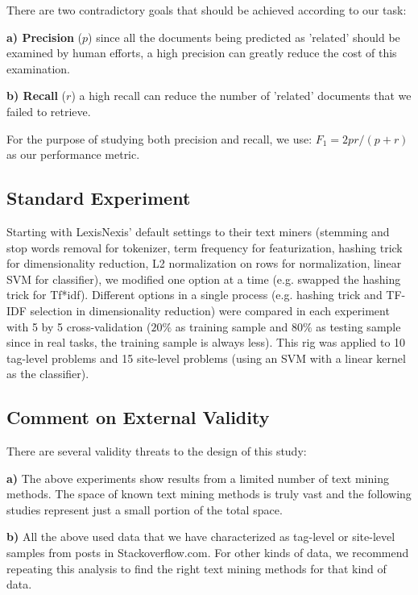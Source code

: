 \documentclass{sig-alternate-05-2015}
\theoremstyle{break}
\begin{document}

There are two contradictory goals that should be achieved according to our task: 

\textbf{a) Precision} ($p$) since all the documents being predicted as 'related' should be examined by human efforts, a high precision can greatly reduce the cost of this examination.

\textbf{b) Recall} ($r$) a high recall can reduce the number of 'related' documents that we failed to retrieve.

For the purpose of studying both precision and recall, we use:
 \mbox{$F_{1}=  2pr/(p+r)$}
as  our  performance metric.

\subsection{Standard Experiment}
%
Starting with  LexisNexis' default
settings to their text miners (stemming and stop words removal for tokenizer, term frequency for featurization, hashing trick for dimensionality reduction, L2 normalization on rows for normalization, linear SVM for classifier), we
 modified one option at a time (e.g. swapped the hashing trick for Tf*idf).
Different options in a single process (e.g. hashing trick and TF-IDF selection in dimensionality reduction) were compared in each experiment with 5 by 5 cross-validation ($20\%$ as training sample and $80\%$ as testing sample since in real tasks, the training sample is always less). 
This rig was applied to 10 tag-level problems and 15 site-level problems (using an SVM
with a linear kernel as the classifier).

\subsection{Comment on External Validity}


There are several validity threats to the design of this study: 

\textbf{a)} The above experiments show results from a
limited number of text mining methods.
The space of known text mining methods is truly vast
and the following studies represent just a small portion of the total space.

 
\textbf{b)} All the above used data that we have characterized as tag-level or site-level samples
from posts in Stackoverflow.com. For other kinds of data, we recommend repeating this
analysis to find the right text mining methods for that kind of data.
\end{document}
